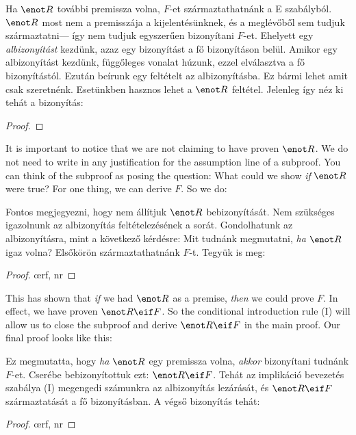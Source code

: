 Ha $\enot R$ további premissza volna, $F$-et származtathatnánk a {\eor}E szabályból. $\enot R$ most nem a premisszája a kijelentésünknek, és a meglévőből sem tudjuk származtatni--- így nem tudjuk egyszerűen bizonyítani $F$-et. Ehelyett egy \emph{albizonyítást} kezdünk, azaz egy bizonyítást a fő bizonyításon belül. Amikor egy albizonyítást kezdünk, függőleges vonalat húzunk, ezzel elválasztva a fő bizonyítástól. Ezután beírunk egy feltételt az albizonyításba. Ez bármi lehet amit csak szeretnénk. Esetünkben hasznos lehet a $\enot R$ feltétel. Jelenleg így néz ki tehát a bizonyítás:

\begin{proof}
	\open
	\close
\end{proof}

It is important to notice that we are not claiming to have proven $\enot R$. We do not need to write in any justification for the assumption line of a subproof. You can think of the subproof as posing the question: What could we show \emph{if} $\enot R$ were true? For one thing, we can derive $F$. So we do:

Fontos megjegyezni, hogy nem állítjuk $\enot R$ bebizonyítását. Nem szükséges igazolnunk az albizonyítás feltételezésének a sorát. Gondolhatunk az albizonyításra, mint a következő kérdésre: Mit tudnánk megmutatni, \emph{ha} $\enot R$ igaz volna? Elsőkörön származtathatnánk $F$-t. Tegyük is meg:

\begin{proof}
	\open
		\oe{rf, nr}
	\close
\end{proof}

This has shown that \emph{if} we had $\enot R$ as a premise, \emph{then} we could prove $F$. In effect, we have proven $\enot R \eif F$. So the conditional introduction rule ({\eif}I) will allow us to close the subproof and derive $\enot R \eif F$ in the main proof. Our final proof looks like this:

Ez megmutatta, hogy \emph{ha} $\enot R$ egy premissza volna, \emph{akkor} bizonyítani tudnánk $F$-et. Cserébe bebizonyítottuk ezt: $\enot R \eif F$. Tehát az implikáció bevezetés szabálya ({\eif}I) megengedi számunkra az albizonyítás lezárását, és $\enot R \eif F$ származtatását a fő bizonyításban. A végső bizonyítás tehát:


\begin{proof}
	\open
		\oe{rf, nr}
	\close
\end{proof}


